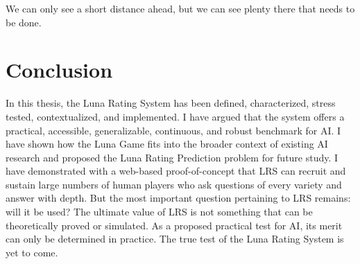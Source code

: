 \begin{savequote}[75mm]
We can only see a short distance ahead, but we can see plenty there that needs to be done.
\end{savequote}

\chapter{Conclusion}

In this thesis, the Luna Rating System has been defined, characterized, stress tested, contextualized, and implemented. I have argued that the system offers a practical, accessible, generalizable, continuous, and robust benchmark for AI. I have shown how the Luna Game fits into the broader context of existing AI research and proposed the Luna Rating Prediction problem for future study. I have demonstrated with a web-based proof-of-concept that LRS can recruit and sustain large numbers of human players who ask questions of every variety and answer with depth. But the most important question pertaining to LRS remains: will it be used? The ultimate value of LRS is not something that can be theoretically proved or simulated. As a proposed practical test for AI, its merit can only be determined in practice. The true test of the Luna Rating System is yet to come. 
